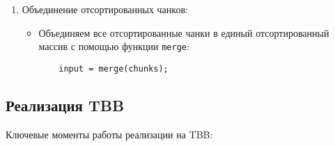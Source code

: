 \documentclass[]{article}
\theoremstyle{remark}
\theoremstyle{definition}
\newcommand{\cpp}[1]{\texttt{#1}}
\begin{document}
\begin{enumerate}
    \item Объединение отсортированных чанков:
    \begin{itemize}
        \item Объединяем все отсортированные чанки в единый отсортированный массив с помощью функции \cpp{merge}:
        \begin{verbatim}
    input = merge(chunks);
        \end{verbatim}
    \end{itemize}
\end{enumerate}


\subsection{Реализация TBB}

\par Ключевые моменты работы реализации на TBB:
\end{document}
